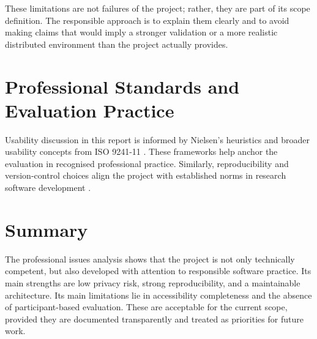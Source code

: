 These limitations are not failures of the project; rather, they are part of its scope definition. The responsible approach is to explain them clearly and to avoid making claims that would imply a stronger validation or a more realistic distributed environment than the project actually provides.

\section{Professional Standards and Evaluation Practice}
Usability discussion in this report is informed by Nielsen’s heuristics \cite{nielsen1994usability} and broader usability concepts from ISO 9241-11 \cite{iso9241_11_2018}. These frameworks help anchor the evaluation in recognised professional practice. Similarly, reproducibility and version-control choices align the project with established norms in research software development \cite{sandve2013ten,wilson2014best,chacon2014progit}.

\section{Summary}
The professional issues analysis shows that the project is not only technically competent, but also developed with attention to responsible software practice. Its main strengths are low privacy risk, strong reproducibility, and a maintainable architecture. Its main limitations lie in accessibility completeness and the absence of participant-based evaluation. These are acceptable for the current scope, provided they are documented transparently and treated as priorities for future work.